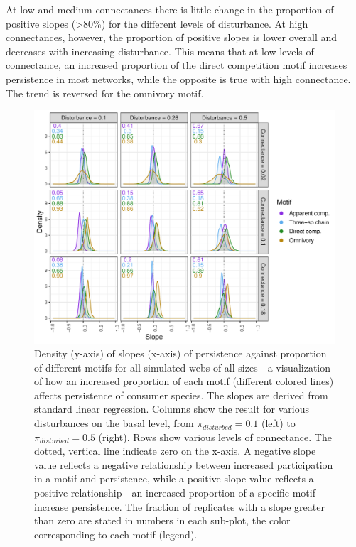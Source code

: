 \documentclass[12pt]{article}
\begin{document}
\begin{spacing}{2.0}
            
            At low and medium connectances there is little change in the proportion of positive slopes (\textgreater80\%) for the different levels of disturbance. 
            At high connectances, however, the proportion of positive slopes is lower overall and decreases with increasing disturbance. 
            This means that at low levels of connectance, an increased proportion of the direct competition motif increases persistence in most networks, while the opposite is true with high connectance. 
            The trend is reversed for the omnivory motif.


        \begin{figure}
            \centering
            \includegraphics[width=\textwidth]{figures/prop_dens_bp_vs_C_allS.pdf}
            \caption{Density (y-axis) of slopes (x-axis) of persistence against proportion of different motifs for all simulated webs of all sizes - a visualization of how an increased proportion of each motif (different colored lines) affects persistence of consumer species. The slopes are derived from standard linear regression. Columns show the result for various disturbances on the basal level, from $\pi_{disturbed} = 0.1$ (left) to $\pi_{disturbed} = 0.5$ (right). Rows show various levels of connectance. The dotted, vertical line indicate zero on the x-axis. A negative slope value reflects a negative relationship between increased participation in a motif and persistence, while a positive slope value reflects a positive relationship - an increased proportion of a specific motif increase persistence. The fraction of replicates with a slope greater than zero are stated in numbers in each sub-plot, the color corresponding to each motif (legend). }
            \label{fig:density_prop_C}
        \end{figure}    
    

\end{spacing}
\end{document}
